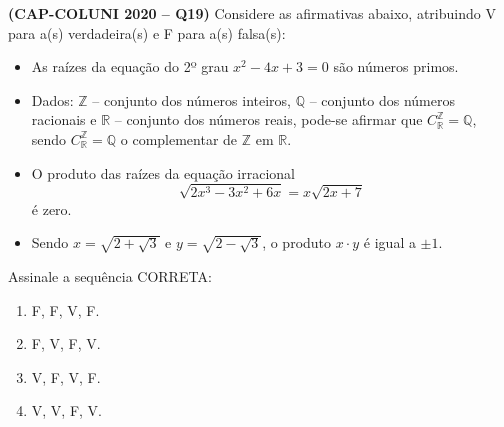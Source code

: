 \textbf{(CAP-COLUNI 2020 -- Q19)} Considere as afirmativas abaixo, atribuindo V para a(s) verdadeira(s) e F para a(s) falsa(s):

\begin{itemize}
\item[(\ \ )] As raízes da equação do 2º grau $x^2-4x+3=0$ são números primos.
\item[(\ \ )] Dados: $\mathbb{Z}$ -- conjunto dos números inteiros, $\mathbb{Q}$ -- conjunto dos números racionais e $\mathbb{R}$ -- conjunto dos números reais, pode-se afirmar que $C_{\mathbb{R}}^{\mathbb{Z}}=\mathbb{Q}$, sendo $C_{\mathbb{R}}^{\mathbb{Z}}=\mathbb{Q}$ o complementar de $\mathbb{Z}$ em $\mathbb{R}$.
\item[(\ \ )] O produto das raízes da equação irracional
\[
\sqrt{2x^3-3x^2+6x}=x\sqrt{2x+7}
\]
é zero.
\item[(\ \ )] Sendo $x=\sqrt{2+\sqrt3}$ e $y=\sqrt{2-\sqrt3}$, o produto $x\cdot y$ é igual a $\pm1$.
\end{itemize}

Assinale a sequência CORRETA:

\begin{enumerate}
	\item F, F, V, F.
	\item F, V, F, V.
	\item V, F, V, F.
	\item V, V, F, V.
\end{enumerate}
